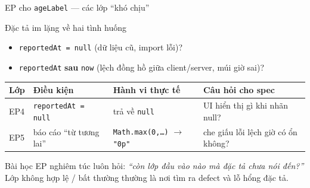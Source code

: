 \documentclass[aspectratio=169,12pt]{beamer}
\begin{document}
\begin{frame}[shrink=6]{EP cho \texttt{ageLabel} --- các lớp ``khó chịu''}
  \begin{block}{Đặc tả im lặng về hai tình huống}
    \begin{itemize}
      \item \texttt{reportedAt = null} (dữ liệu cũ, import lỗi)?
      \item \texttt{reportedAt} \textbf{sau} \texttt{now} (lệch đồng hồ giữa
        client/server, múi giờ sai)?
    \end{itemize}
  \end{block}

  \vspace{0.2em}
  \begin{center}
  \small
  \begin{tabular}{lllp{3.4cm}}
    \toprule
    \textbf{Lớp} & \textbf{Điều kiện} & \textbf{Hành vi thực tế} & \textbf{Câu hỏi cho spec} \\
    \midrule
    EP4 & \texttt{reportedAt = null} & trả về \texttt{null} & UI hiển thị gì khi nhãn null? \\
    EP5 & báo cáo ``từ tương lai'' & \texttt{Math.max(0,\dots)} $\to$ \texttt{"0p"} & che giấu lỗi lệch giờ có ổn không? \\
    \bottomrule
  \end{tabular}
  \end{center}

  \vspace{0.3em}
  \begin{alertblock}{Bài học}
    EP nghiêm túc luôn hỏi: \textit{``còn lớp đầu vào nào mà đặc tả chưa nói đến?''}
    Lớp không hợp lệ / bất thường thường là nơi tìm ra defect và lỗ hổng đặc tả.
  \end{alertblock}
\end{frame}
\end{document}

